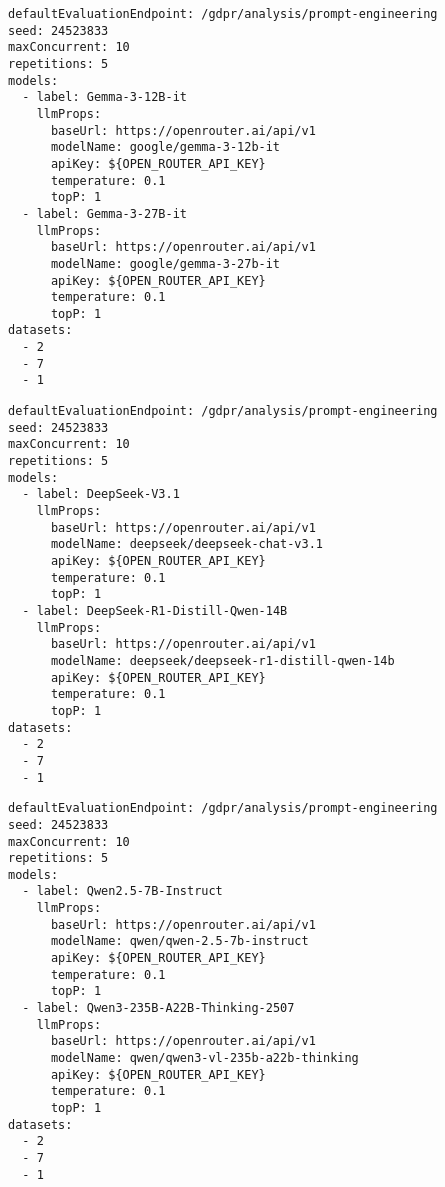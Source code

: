 \begin{lstlisting}[caption={Konfigurationsdatei des Experiments mit Gemma Modellen}, label={lst:gemma-experiment-config}]
defaultEvaluationEndpoint: /gdpr/analysis/prompt-engineering
seed: 24523833
maxConcurrent: 10
repetitions: 5
models:
  - label: Gemma-3-12B-it
    llmProps:
      baseUrl: https://openrouter.ai/api/v1
      modelName: google/gemma-3-12b-it
      apiKey: ${OPEN_ROUTER_API_KEY}
      temperature: 0.1
      topP: 1
  - label: Gemma-3-27B-it
    llmProps:
      baseUrl: https://openrouter.ai/api/v1
      modelName: google/gemma-3-27b-it
      apiKey: ${OPEN_ROUTER_API_KEY}
      temperature: 0.1
      topP: 1
datasets:
  - 2
  - 7
  - 1
\end{lstlisting}

\begin{lstlisting}[caption={Konfigurationsdatei des Experiments mit DeepSeek Modellen}, label={lst:deepseek-experiment-config}]
defaultEvaluationEndpoint: /gdpr/analysis/prompt-engineering
seed: 24523833
maxConcurrent: 10
repetitions: 5
models:
  - label: DeepSeek-V3.1
    llmProps:
      baseUrl: https://openrouter.ai/api/v1
      modelName: deepseek/deepseek-chat-v3.1
      apiKey: ${OPEN_ROUTER_API_KEY}
      temperature: 0.1
      topP: 1
  - label: DeepSeek-R1-Distill-Qwen-14B
    llmProps:
      baseUrl: https://openrouter.ai/api/v1
      modelName: deepseek/deepseek-r1-distill-qwen-14b
      apiKey: ${OPEN_ROUTER_API_KEY}
      temperature: 0.1
      topP: 1
datasets:
  - 2
  - 7
  - 1
\end{lstlisting}

\begin{lstlisting}[caption={Konfigurationsdatei des Experiments mit Qwen Modellen}, label={lst:qwen-experiment-config}]
defaultEvaluationEndpoint: /gdpr/analysis/prompt-engineering
seed: 24523833
maxConcurrent: 10
repetitions: 5
models:
  - label: Qwen2.5-7B-Instruct
    llmProps:
      baseUrl: https://openrouter.ai/api/v1
      modelName: qwen/qwen-2.5-7b-instruct
      apiKey: ${OPEN_ROUTER_API_KEY}
      temperature: 0.1
      topP: 1
  - label: Qwen3-235B-A22B-Thinking-2507
    llmProps:
      baseUrl: https://openrouter.ai/api/v1
      modelName: qwen/qwen3-vl-235b-a22b-thinking
      apiKey: ${OPEN_ROUTER_API_KEY}
      temperature: 0.1
      topP: 1
datasets:
  - 2
  - 7
  - 1
\end{lstlisting}

